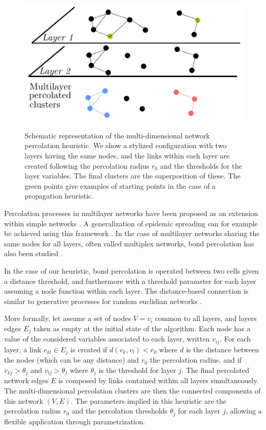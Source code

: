 \documentclass{article}
\begin{document}
\begin{figure}[ht] 
  {\includegraphics[width=\linewidth]{principle.pdf}}
  \centering
  \caption{Schematic representation of the multi-dimensional network percolation heuristic. We show a stylized configuration with two layers having the same nodes, and the links within each layer are created following the percolation radius $r_0$ and the thresholds for the layer variables. The final clusters are the superposition of these. The green points give examples of starting points in the case of a propagation heuristic.\label{fig:method}}
\end{figure}


Percolation processes in multilayer networks have been proposed as an extension within simple networks \citep{boccaletti2014structure}. A generalization of epidemic spreading can for example be achieved using this framework \citep{son2012percolation}. In the case of multilayer networks sharing the same nodes for all layers, often called multiplex networks, bond percolation has also been studied \citep{hackett2016bond}.


In the case of our heuristic, bond percolation is operated between two cells given a distance threshold, and furthermore with a threshold parameter for each layer assuming a node function within each layer. The distance-based connection is similar to generative processes for random euclidian networks \citep{penrose1999k}.

More formally, let assume a set of nodes $V = v_i$ common to all layers, and layers edges $E_j$ taken as empty at the initial state of the algorithm. Each node has a value of the considered variables associated to each layer, written $v_{ij}$. For each layer, a link $e_{kl} \in E_j$ is created if $d(v_k,v_l) < r_0$ where $d$ is the distance between the nodes (which can be any distance) and $r_0$ the percolation radius, and if $v_{kj} > \theta_j$ and $v_{lj} > \theta_j$ where $\theta_j$ is the threshold for layer $j$. The final percolated network edges $E$ is composed by links contained within all layers simultaneously. The multi-dimensional percolation clusters are then the connected components of this network $(V,E)$. The parameters implied in this heuristic are the percolation radius $r_0$ and the percolation thresholds $\theta_j$ for each layer $j$, allowing a flexible application through parametrization.
\end{document}
